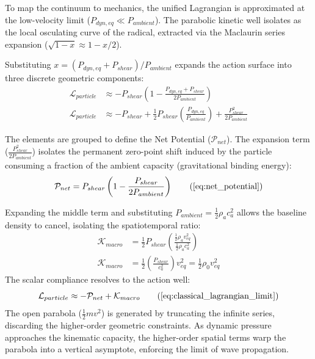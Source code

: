 To map the continuum to mechanics, the unified Lagrangian is approximated at the low-velocity limit ($P_{dyn,eq} \ll P_{ambient}$). The parabolic kinetic well isolates as the local osculating curve of the radical, extracted via the Maclaurin series expansion ($\sqrt{1-x} \approx 1 - x/2$). 

Substituting $x = (P_{dyn,eq} + P_{shear}) / P_{ambient}$ expands the action surface into three discrete geometric components:
\begin{align}
    \mathcal{L}_{particle} &\approx - P_{shear} \left( 1 - \frac{P_{dyn,eq} + P_{shear}}{2 P_{ambient}} \right) \nonumber \\
    \mathcal{L}_{particle} &\approx - P_{shear} + \frac{1}{2} P_{shear} \left( \frac{P_{dyn,eq}}{P_{ambient}} \right) + \frac{P_{shear}^2}{2 P_{ambient}} \nonumber
\end{align}

The elements are grouped to define the Net Potential ($\mathcal{P}_{net}$). The expansion term ($\frac{P_{shear}^2}{2 P_{ambient}}$) isolates the permanent zero-point shift induced by the particle consuming a fraction of the ambient capacity (gravitational binding energy): 
\begin{equation}
    \mathcal{P}_{net} = P_{shear} \left( 1 - \frac{P_{shear}}{2 P_{ambient}} \right) \tag{\ref{eq:net_potential}}
\end{equation}

Expanding the middle term and substituting $P_{ambient} = \frac{1}{2}\rho_a c_a^2$ allows the baseline density to cancel, isolating the spatiotemporal ratio: 
\begin{align}
    \mathcal{K}_{macro} &= \frac{1}{2} P_{shear} \left( \frac{\frac{1}{2}\rho_a v_{eq}^2}{\frac{1}{2}\rho_a c_a^2} \right) \nonumber \\
    \mathcal{K}_{macro} &= \frac{1}{2} \left( \frac{P_{shear}}{c_a^2} \right) v_{eq}^2 = \frac{1}{2}\rho_0 v_{eq}^2 \nonumber
\end{align}
The scalar compliance resolves to the action well:
\begin{equation}
    \mathcal{L}_{particle} \approx - \mathcal{P}_{net} + \mathcal{K}_{macro} \tag{\ref{eq:classical_lagrangian_limit}}
\end{equation}
The open parabola ($\frac{1}{2}mv^2$) is generated by truncating the infinite series, discarding the higher-order geometric constraints. As dynamic pressure approaches the kinematic capacity, the higher-order spatial terms warp the parabola into a vertical asymptote, enforcing the limit of wave propagation.

